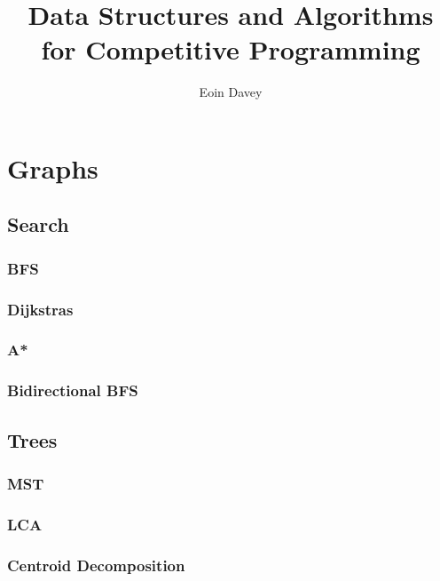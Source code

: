 \documentclass[twocolumn]{article}
\begin{document}
    \title{Data Structures and Algorithms for Competitive Programming}
    \author{Eoin Davey}
    \maketitle
    \tableofcontents
    \newpage

    \section{Graphs}

    \subsection{Search}
        \subsubsection{BFS}
        
        \subsubsection{Dijkstras}
        
        \subsubsection{A*}
        
        \subsubsection{Bidirectional BFS}
        

    \subsection{Trees}
        \subsubsection{MST}
        
        \subsubsection{LCA}
        
        \subsubsection{Centroid Decomposition}
        
\end{document}
